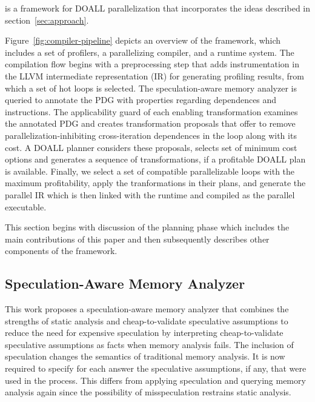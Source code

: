 %
\name is a framework for DOALL parallelization that incorporates the
ideas described in section~\ref{sec:approach}.


Figure~\ref{fig:compiler-pipeline} depicts an overview of the \name
framework, which includes a set of profilers, a parallelizing compiler,
and a runtime system.
%
The compilation flow begins with a preprocessing step that adds
instrumentation in the LLVM intermediate representation (IR) for
generating profiling results, from which a set of hot
loops is selected.
The speculation-aware memory analyzer
is queried to annotate the PDG with properties regarding dependences and
instructions. The applicability guard of each enabling
transformation examines the annotated PDG and creates transformation
proposals that offer to remove parallelization-inhibiting cross-iteration
dependences in the loop along with its cost. A DOALL planner considers
these proposals, selects set of minimum cost options and generates a sequence
of transformations, if a profitable DOALL plan is available.
Finally, we select a set of
compatible parallelizable loops with the maximum profitability, apply the
tranformations in their plans, and generate the parallel IR which is
then linked with the runtime and compiled as the parallel executable.

 This section begins with discussion of the planning phase which
 includes the main contributions of this paper and then subsequently
 describes other components of the framework.

\subsection{Speculation-Aware Memory Analyzer}
\label{sama}

%
%
%
%
%
This work proposes a speculation-aware memory analyzer that
combines the strengths of static analysis and cheap-to-validate
speculative assumptions to reduce the need for expensive speculation by
interpreting cheap-to-validate speculative assumptions as facts when memory
analysis fails.
%
The inclusion of speculation changes the semantics of traditional
memory analysis. It is now required to specify for each answer the
speculative assumptions, if any, that were used in the process.
%
This differs from applying speculation and querying memory analysis again
since the possibility of misspeculation restrains static analysis.

